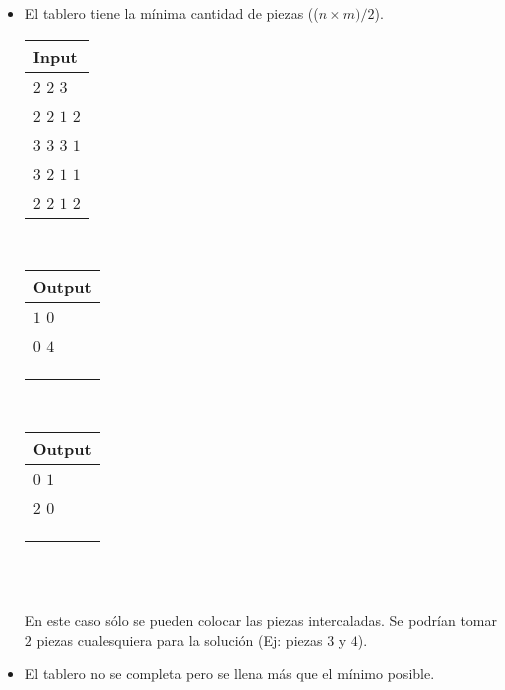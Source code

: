 \documentclass[11pt, a4paper, twoside]{article}
\begin{document}
\begin{itemize}
\begin{itemize}
		\item El tablero tiene la mínima cantidad de piezas (($n \times m)/2$). \\
		
			\begin{minipage}{0.2\textwidth}
				\begin{tabular}{l}
					Input  \\
					\hline
					$2$ $2$ $3$     \\
					$2$ $2$ $1$ $2$ \\
					$3$ $3$ $3$ $1$ \\
					$3$ $2$ $1$ $1$ \\
					$2$ $2$ $1$ $2$ \\
				\end{tabular} \\  
			\end{minipage}
			\begin{minipage}{0.2\textwidth}	
				\begin{tabular}{l}
					Output  \\
					\hline
					$1$ $0$ \\
					$0$ $4$ \\
					\\
					\\
					\\
				\end{tabular} \\
			\end{minipage} 
			\begin{minipage}{0.2\textwidth}	
				\begin{tabular}{l}
					Output  \\
					\hline
					$0$ $1$ \\
					$2$ $0$ \\
					\\
					\\
					\\
				\end{tabular} \\
			\end{minipage} \\
		
		En este caso sólo se pueden colocar las piezas intercaladas. Se podrían tomar $2$ piezas cualesquiera para la solución (Ej: piezas $3$ y $4$). \\
		
		\item El tablero no se completa pero se llena más que el mínimo posible. \\
		

\end{itemize}
\end{itemize}
\end{document}
